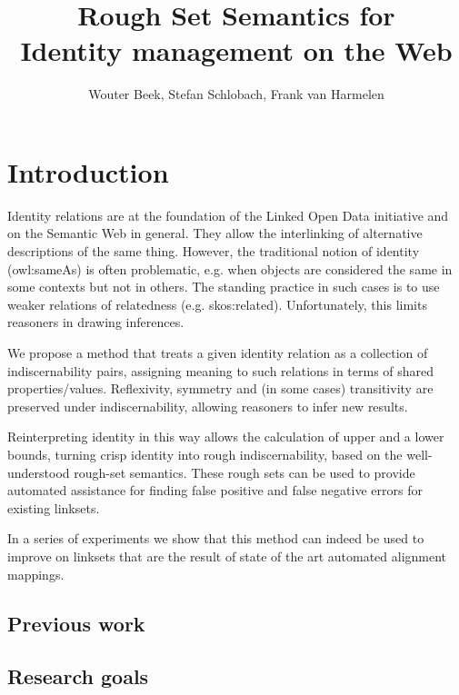 \documentclass[letterpaper]{article}
\begin{document}
\title{Rough Set Semantics for\\Identity management on the Web}
\author{Wouter Beek, Stefan Schlobach, Frank van Harmelen}
\maketitle
\begin{abstract}
\begin{quote}
\end{quote}
\end{abstract}

\section{Introduction}

Identity relations are at the foundation of the Linked Open Data initiative and on the Semantic Web in general. They allow the interlinking of alternative descriptions of the same thing. However, the traditional notion of identity (owl:sameAs) is often problematic, e.g. when objects are considered the same in some contexts but not in others. The standing practice in such cases is to use weaker relations of relatedness (e.g. skos:related). Unfortunately, this limits reasoners in drawing inferences. 

We propose a method that treats a given identity relation as a collection of indiscernability pairs, assigning meaning to such relations in terms of shared properties/values. Reflexivity, symmetry and (in some cases) transitivity are preserved under indiscernability, allowing reasoners to infer new results.

Reinterpreting identity in this way allows the calculation of upper and a lower bounds, turning crisp identity into rough indiscernability, based on the well-understood rough-set semantics. These rough sets can be used to provide automated assistance for finding false positive and false negative errors for existing linksets.

In a series of experiments we show that this method can indeed be used to improve on linksets that are the result of state of the art automated alignment mappings.

\subsection{Previous work}

\subsection{Research goals}
\end{document}
